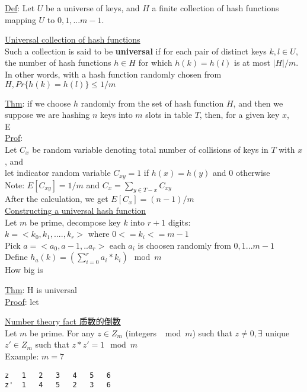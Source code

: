 \documentclass{article}
\begin{document}
\underline{Def}: Let $U$ be a universe of keys, and  $H$ a finite collection of hash functions mapping $U$ to ${0, 1, ... m-1}$.

\underline{Universal collection of hash functions}\\
Such a collection is said to be \textbf{universal} if for each pair of distinct keys $k,l \in U$, the number of hash functions $h \in H$ for which $h(k)=h(l)$ is at most $|H|/m$.\\
In other words, with a hash function randomly chosen from $H, Pr\{h(k)=h(l)\} \leq 1/m$

\underline{Thm}: if we choose $h$ randomly from the set of hash function $H$, and then we suppose we are hashing $n$ keys into $m$ slots in table $T$, then, for a given key $x$,\\
E\\
\underline{Prof}:\\
Let $C_x$ be random variable denoting total number of collisions of keys in $T$ with $x$, and \\
let indicator random variable $C_{xy}=1$ if $h(x)=h(y)$ and $0$ otherwise \\
Note: $E[C_{xy}]=1/m$ and $C_x= \sum_{y \in T-{x}} C_{xy}$\\
After the calculation, we get $E[C_x]=(n-1)/m$\\

\underline{Constructing a universal hash function}\\
Let $m$ be prime, decompose key $k$ into $r+1$ digits:\\
$k=<k_0, k_1, ...., k_r>$ where $0<= k_i <=m-1$\\
Pick $a=<a_0, a-1, ..a_r>$ each $a_i$ is choosen randomly from ${0,1 ... m-1}$\\
Define $h_a(k)=(\sum_{i=0}^r a_i * k_i) \mod m$\\
How big is

\underline{Thm}: H is universal\\
\underline{Proof}: let

\underline{Number theory fact 质数的倒数}\\
Let $m$ be prime. For any $z \in Z_m$ (integers $\mod m$) such that $z \neq 0, \exists$ unique $z' \in Z_m$ such that $z*z' = 1 \mod m$\\
Example: $m=7$\\
\begin{verbatim}
z	1	2	3	4	5	6
z'	1	4	5	2	3	6
\end{verbatim}
\end{document}

